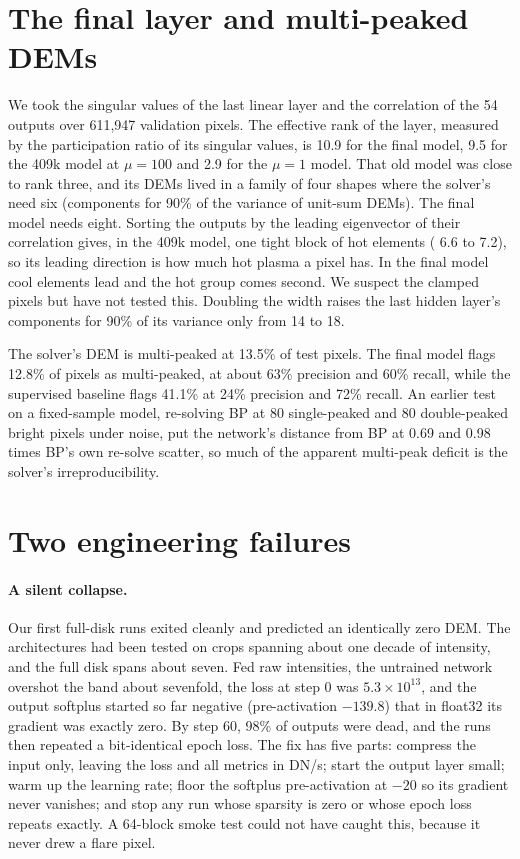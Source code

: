 \section{The final layer and multi-peaked DEMs}
\label{app:network}

We took the singular values of the last linear layer and the correlation of the 54 outputs over 611,947 validation pixels. The effective rank of the layer, measured by the participation ratio of its singular values, is 10.9 for the final model, 9.5 for the 409k model at $\mu=100$ and 2.9 for the $\mu=1$ model. That old model was close to rank three, and its DEMs lived in a family of four shapes where the solver's need six (components for 90\% of the variance of unit-sum DEMs). The final model needs eight. Sorting the outputs by the leading eigenvector of their correlation gives, in the 409k model, one tight block of hot elements (\logT{} 6.6 to 7.2), so its leading direction is how much hot plasma a pixel has. In the final model cool elements lead and the hot group comes second. We suspect the clamped pixels but have not tested this. Doubling the width raises the last hidden layer's components for 90\% of its variance only from 14 to 18.

The solver's DEM is multi-peaked at 13.5\% of test pixels. The final model flags 12.8\% of pixels as multi-peaked, at about 63\% precision and 60\% recall, while the supervised baseline flags 41.1\% at 24\% precision and 72\% recall. An earlier test on a fixed-sample model, re-solving BP at 80 single-peaked and 80 double-peaked bright pixels under noise, put the network's distance from BP at 0.69 and 0.98 times BP's own re-solve scatter, so much of the apparent multi-peak deficit is the solver's irreproducibility.

\section{Two engineering failures}
\label{app:engineering}

\paragraph{A silent collapse.}
Our first full-disk runs exited cleanly and predicted an identically zero DEM. The architectures had been tested on crops spanning about one decade of intensity, and the full disk spans about seven. Fed raw intensities, the untrained network overshot the band about sevenfold, the loss at step 0 was $5.3\times10^{13}$, and the output softplus started so far negative (pre-activation $-139.8$) that in float32 its gradient was exactly zero. By step 60, 98\% of outputs were dead, and the runs then repeated a bit-identical epoch loss. The fix has five parts: compress the input only, leaving the loss and all metrics in DN/s; start the output layer small; warm up the learning rate; floor the softplus pre-activation at $-20$ so its gradient never vanishes; and stop any run whose sparsity is zero or whose epoch loss repeats exactly. A 64-block smoke test could not have caught this, because it never drew a flare pixel.

